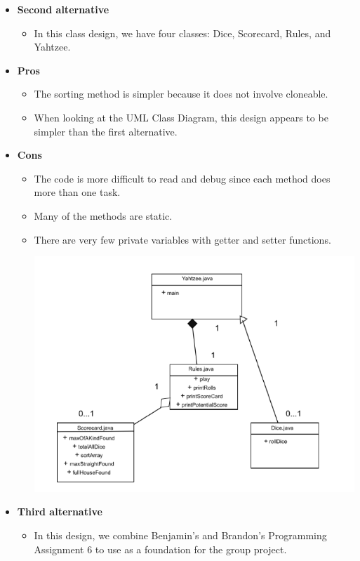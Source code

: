 \documentclass[]{report}   %
\begin{document}
\begin{itemize}
\begin{itemize}
	\item \textbf{Second alternative}
		\begin{itemize}
		\item In this class design, we have four classes: Dice, Scorecard, Rules, and Yahtzee.
		\end{itemize}
	\item \textbf{Pros}
		\begin{itemize}
		\item The sorting method is simpler because it does not involve cloneable.
		\item When looking at the UML Class Diagram, this design appears to be simpler than the first alternative.
		\end{itemize}
	\item \textbf{Cons}
		\begin{itemize}
		\item The code is more difficult to read and debug since each method does more than one task.
		\item Many of the methods are static.
		\item There are very few private variables with getter and setter functions.
		\begin{center}
		\includegraphics[width=5.4in]{Graphics/DAA1-A2.png} 
		\end{center}
		\end{itemize}
	\item \textbf{Third alternative}
		\begin{itemize}
		\item In this design, we combine Benjamin's and Brandon's Programming Assignment 6 to use as a foundation for the group project.

\end{itemize}
\end{itemize}
\end{itemize}
\end{document}

